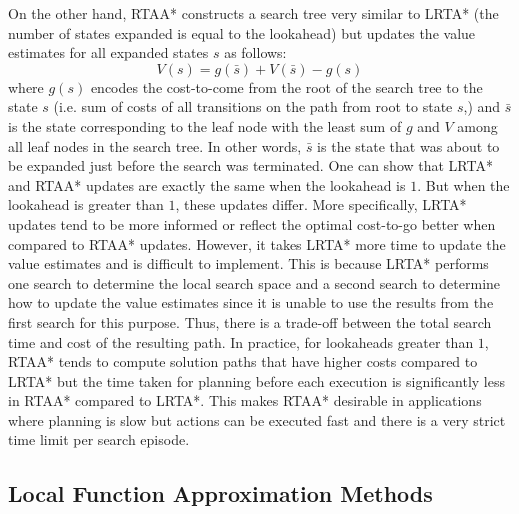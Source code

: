 On the other hand, RTAA* constructs a search tree very similar to
LRTA* (the number of states expanded is equal to the lookahead) but
updates the value estimates for all expanded states $s$ as follows:
\begin{equation}
  \label{eq:11}
  V(s) = g(\bar{s}) + V(\bar{s}) - g(s)
\end{equation}
where $g(s)$ encodes the cost-to-come from the root of the search tree
to the state $s$ (i.e. sum of costs of all transitions on the path
from root to state $s$,) and $\bar{s}$ is the state corresponding to
the leaf node with the least sum of $g$ and $V$ among all leaf nodes
in the search tree. In other words, $\bar{s}$ is the state that was
about to be expanded just before the search was terminated. One can
show that LRTA* and RTAA* updates are exactly the same when the
lookahead is $1$. But when the lookahead is greater than $1$, these
updates differ. More specifically, LRTA* updates tend to be more
informed or reflect the optimal cost-to-go better when compared to
RTAA* updates. However, it takes LRTA* more time to update the value
estimates and is difficult to implement. This is because LRTA*
performs one search to determine the local search space and a second
search to determine how to update the value estimates since it is
unable to use the results from the first search for this
purpose. Thus, there is a trade-off between the total search time and
cost of the resulting path. In practice, for lookaheads greater than
$1$, RTAA* tends to compute solution paths that have higher costs
compared to LRTA* but the time taken for planning before each execution is
significantly less in RTAA* compared to LRTA*. This makes RTAA*
desirable in applications where planning is slow but actions can be
executed fast and there is a very strict time limit per search episode.

\subsection{Local Function Approximation Methods}
\label{sec:local-funct-appr-1}



